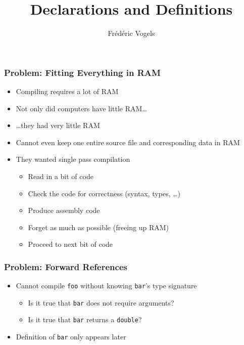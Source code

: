 \usepackage{../pvm}
\usepackage{emerald}
\usepackage[T1]{fontenc}

\usetikzlibrary{shadows}

\title{Declarations and Definitions}
\author{Fr\'ed\'eric Vogels}





\begin{frame}
  \titlepage
\end{frame}


\begin{frame}
  \frametitle{Problem: Fitting Everything in RAM}
  \begin{itemize}
    \item Compiling requires a lot of RAM
    \item Not only did computers have little RAM\dots
    \item \dots they had very little RAM
    \item Cannot even keep one entire source file and corresponding data in RAM
    \item They wanted single pass compilation
      \begin{itemize}
        \item Read in a bit of code
        \item Check the code for correctness (syntax, types, \dots)
        \item Produce assembly code
        \item Forget as much as possible (freeing up RAM)
        \item Proceed to next bit of code
      \end{itemize}
  \end{itemize}
\end{frame}

\begin{frame}
  \frametitle{Problem: Forward References}
  \begin{itemize}
    \item Cannot compile {\tt foo} without knowing {\tt bar}'s type signature
          \begin{itemize}
            \item Is it true that {\tt bar} does not require arguments?
            \item Is it true that {\tt bar} returns a {\tt double}?
          \end{itemize}
    \item Definition of {\tt bar} only appears later
  \end{itemize}
\end{frame}

